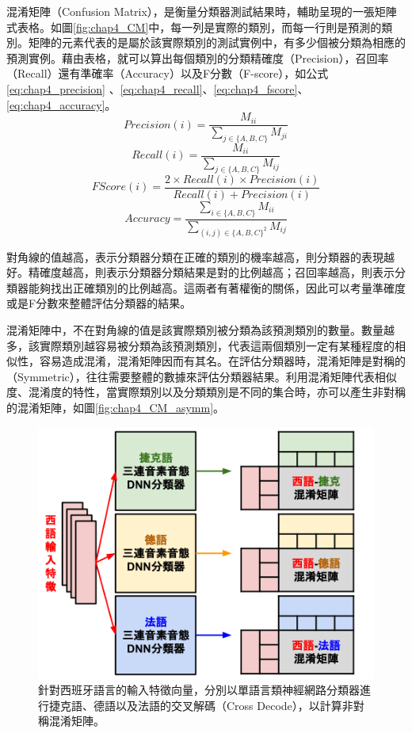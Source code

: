 混淆矩陣（Confusion Matrix），是衡量分類器測試結果時，輔助呈現的一張矩陣式表格。如圖\ref{fig:chap4_CM}中，每一列是實際的類別，而每一行則是預測的類別。矩陣的元素代表的是屬於該實際類別的測試實例中，有多少個被分類為相應的預測實例。藉由表格，就可以算出每個類別的分類精確度（Precision），召回率（Recall）還有準確率（Accuracy）以及F分數（F-score），如公式\ref{eq:chap4_precision} 、\ref{eq:chap4_recall}、\ref{eq:chap4_fscore}、\ref{eq:chap4_accuracy}。
\begin{equation}\label{eq:chap4_precision}
Precision(i) = \frac{M_{ii}}{\sum_{j \in \{ A,B,C\}} M_{ji} } 
\end{equation}
\begin{equation}\label{eq:chap4_recall}
Recall(i) = \frac{M_{ii}}{\sum_{j \in \{ A,B,C\}} M_{ij} } 
\end{equation}
\begin{equation}\label{eq:chap4_fscore}
FScore(i) = \frac{2 \times Recall(i) \times Precision(i) }{ Recall(i) + Precision(i)} 
\end{equation}
\begin{equation}\label{eq:chap4_accuracy}
Accuracy = \frac{\sum_{i \in \{ A,B,C\}}M_{ii} }{ \sum_{(i,j) \in \{A,B,C\}^2} M_{ij} }
\end{equation}

對角線的值越高，表示分類器分類在正確的類別的機率越高，則分類器的表現越好。精確度越高，則表示分類器分類結果是對的比例越高；召回率越高，則表示分類器能夠找出正確類別的比例越高。這兩者有著權衡的關係，因此可以考量準確度或是F分數來整體評估分類器的結果。

混淆矩陣中，不在對角線的值是該實際類別被分類為該預測類別的數量。數量越多，該實際類別越容易被分類為該預測類別，代表這兩個類別一定有某種程度的相似性，容易造成混淆，混淆矩陣因而有其名。在評估分類器時，混淆矩陣是對稱的（Symmetric），往往需要整體的數據來評估分類器結果。利用混淆矩陣代表相似度、混淆度的特性，當實際類別以及分類類別是不同的集合時，亦可以產生非對稱的混淆矩陣，如圖\ref{fig:chap4_CM_asymm}。
\begin{figure}[!h]
\centering
\includegraphics[scale=0.4]{images/chap4_cross_decode.png}
\caption{針對西班牙語言的輸入特徵向量，分別以單語言類神經網路分類器進行捷克語、德語以及法語的交叉解碼（Cross Decode），以計算非對稱混淆矩陣。}
\label{fig:chap4_cross_decode}
\end{figure}


